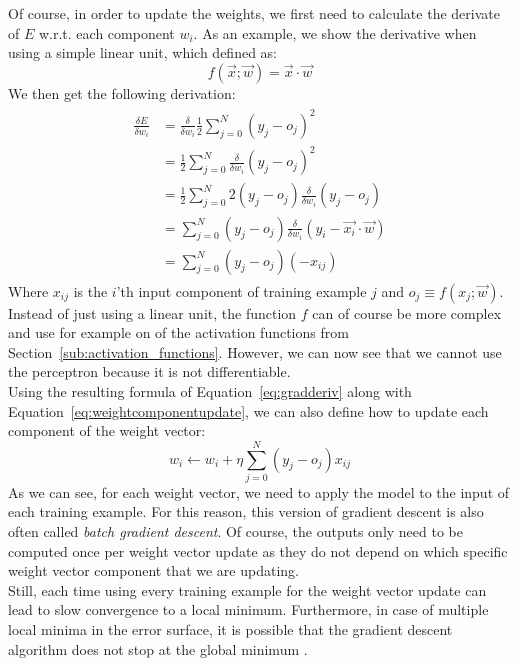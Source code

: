 Of course, in order to update the weights, we first need to calculate the derivate of $E$ w.r.t. each component $w_i$. As an example, we show the derivative when using a simple linear unit, which defined as:
\begin{equation}
    f(\overrightarrow{x};\overrightarrow{w}) = \overrightarrow{x} \cdot \overrightarrow{w}
\end{equation}
We then get the following derivation:
\begin{align}
    \label{eq:gradderiv}
    \begin{split}
        \frac{\delta E}{\delta w_i} &= \frac{\delta}{\delta w_i} \frac{1}{2} \sum_{j=0}^N (y_j - o_j)^2\\
        &= \frac{1}{2} \sum_{j=0}^N \frac{\delta}{\delta w_i} (y_j - o_j)^2\\
        &= \frac{1}{2} \sum_{j=0}^N 2 (y_j - o_j) \frac{\delta}{\delta w_i} (y_j - o_j)\\
        &= \sum_{j=0}^N (y_j - o_j) \frac{\delta}{\delta w_i} (y_i - \overrightarrow{x_i} \cdot \overrightarrow{w})\\
        &= \sum_{j=0}^N (y_j - o_j)(-x_{ij})
    \end{split}
\end{align}
Where $x_{ij}$ is the $i$'th input component of training example $j$ and $o_j \equiv f(x_j; \overrightarrow{w})$. Instead of just using a linear unit, the function $f$ can of course be more complex and use for example on of the activation functions from Section~\ref{sub:activation_functions}. However, we can now see that we cannot use the perceptron because it is not differentiable.\\

Using the resulting formula of Equation~\ref{eq:gradderiv} along with Equation~\ref{eq:weightcomponentupdate}, we can also define how to update each component of the weight vector:
\begin{equation}
    w_i \gets w_i + \eta \sum_{j=0}^N (y_j - o_j)x_{ij}
\end{equation}
As we can see, for each weight vector, we need to apply the model to the input of each training example. For this reason, this version of gradient descent is also often called \textit{batch gradient descent}. Of course, the outputs only need to be computed once per weight vector update as they do not depend on which specific weight vector component that we are updating.\\

Still, each time using every training example for the weight vector update can lead to slow convergence to a local minimum. Furthermore, in case of multiple local minima in the error surface, it is possible that the gradient descent algorithm does not stop at the global minimum \citep{ML}.


